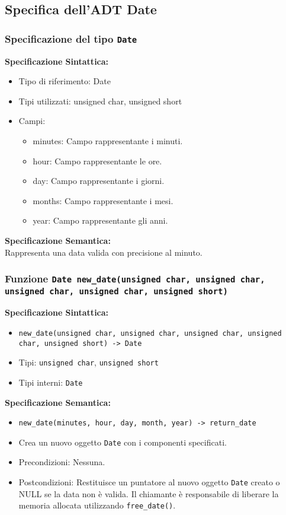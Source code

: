 \documentclass[11pt]{scrartcl} %
\begin{document}
\subsection{Specifica dell'ADT Date}

\subsubsection{Specificazione del tipo \texttt{Date}}


\textbf{Specificazione Sintattica:}
\begin{itemize}
	\item Tipo di riferimento: Date
	\item Tipi utilizzati: unsigned char, unsigned short
	\item Campi:
	      \begin{itemize}
		      \item minutes: Campo rappresentante i minuti.
		      \item hour: Campo rappresentante le ore.
		      \item day: Campo rappresentante i giorni.
		      \item months: Campo rappresentante i mesi.
		      \item year: Campo rappresentante gli anni.
	      \end{itemize}
\end{itemize}

\textbf{Specificazione Semantica:} \\
Rappresenta una data valida con precisione al minuto.

\subsubsection{Funzione \texttt{Date new\_date(unsigned char, unsigned char, unsigned char, unsigned char, unsigned short) }}

\textbf{Specificazione Sintattica:}
\begin{itemize}
	\item \texttt{new\_date(unsigned char, unsigned char, unsigned char, unsigned char, unsigned short) -> Date}
	\item Tipi: \texttt{unsigned char}, \texttt{unsigned short}
	\item Tipi interni: \texttt{Date}
\end{itemize}

\textbf{Specificazione Semantica:}
\begin{itemize}
	\item \texttt{new\_date(minutes, hour, day, month, year) -> return\_date}
	\item Crea un nuovo oggetto \texttt{Date} con i componenti specificati.
	\item Precondizioni: Nessuna.
	\item Postcondizioni: Restituisce un puntatore al nuovo oggetto \texttt{Date} creato o NULL se la data non è valida. Il chiamante è responsabile di liberare la memoria allocata utilizzando \texttt{free\_date()}.
\end{itemize}
\end{document}
